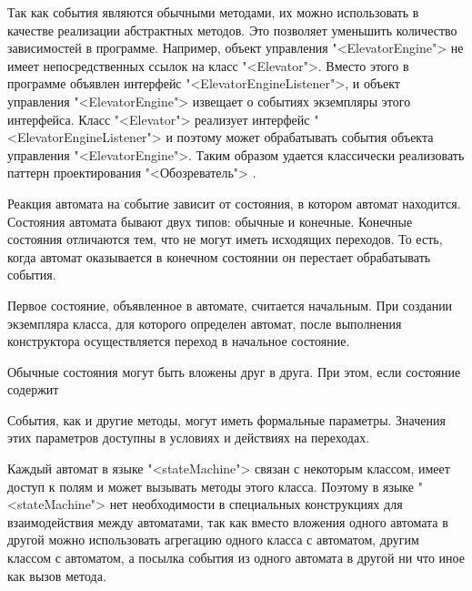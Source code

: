 Так как события являются обычными методами, их можно использовать в качестве реализации абстрактных методов. Это позволяет уменьшить количество зависимостей в программе. Например, объект управления "<ElevatorEngine"> не имеет непосредственных ссылок на класс "<Elevator">. Вместо этого в программе объявлен интерфейс "<ElevatorEngineListener">, и объект управления "<ElevatorEngine"> извещает о событиях экземпляры этого интерфейса. Класс "<Elevator"> реализует интерфейс "<ElevatorEngineListener"> и поэтому может обрабатывать события объекта управления "<ElevatorEngine">. Таким образом удается классически реализовать паттерн проектирования "<Обозреватель"> \cite{gof}.

Реакция автомата на событие зависит от состояния, в котором автомат находится. Состояния автомата бывают двух типов: обычные и конечные. Конечные состояния отличаются тем, что не могут иметь исходящих переходов. То есть, когда автомат оказывается в конечном состоянии он перестает обрабатывать события.

Первое состояние, объявленное в автомате, считается начальным. При создании экземпляра класса, для которого определен автомат, после выполнения конструктора осуществляется переход в начальное состояние.

Обычные состояния могут быть вложены друг в друга. При этом, если состояние содержит

События, как и другие методы, могут иметь формальные параметры. Значения этих параметров доступны в условиях и действиях на переходах.



Каждый автомат в языке "<stateMachine"> связан с некоторым классом, имеет доступ к полям и может вызывать методы этого класса. Поэтому в языке "<stateMachine"> нет необходимости в специальных конструкциях для взаимодействия между автоматами, так как вместо вложения одного автомата в другой можно использовать агрегацию одного класса с автоматом, другим классом с автоматом, а посылка события из одного автомата в другой ни что иное как вызов метода.